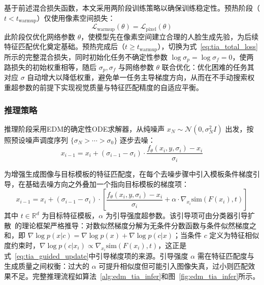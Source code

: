 基于前述混合损失函数，本文采用两阶段训练策略以确保训练稳定性。预热阶段（$t < t_{\text{warmup}}$）仅使用像素空间损失：
\begin{equation}\label{eq:tia_warmup_loss}
  \mathcal{L}_{\text{warmup}}(\theta) = \mathcal{L}_{\text{pixel}}(\theta)
\end{equation}
此阶段仅优化网络参数 $\theta$，使模型先在像素空间建立合理的人脸生成先验，为后续特征匹配优化奠定基础。预热完成后（$t \geq t_{\text{warmup}}$），切换为式~\eqref{eq:tia_total_loss}所示的完整混合损失，同时初始化任务不确定性参数 $\log\sigma_p = \log\sigma_f = 0$，使两路损失的初始权重相等，随后 $\sigma_p, \sigma_f$ 与网络参数 $\theta$ 联合优化：优化困难的任务其对应 $\sigma$ 自动增大以降低权重，避免单一任务主导梯度方向，从而在不手动搜索权重超参数的前提下实现视觉质量与特征匹配精度的自适应平衡。

\subsubsection{推理策略}

推理阶段采用EDM的确定性ODE求解器，从纯噪声 $x_N \sim \mathcal{N}(0, \sigma_N^2 I)$ 出发，按照预设噪声调度序列 $\{\sigma_N > \cdots > \sigma_0\}$ 逐步去噪：
\begin{equation}\label{eq:tia_sampling_update}
  x_{i-1} = x_i + (\sigma_{i-1} - \sigma_i) \cdot \frac{f_\theta(x_i, y, \sigma_i) - x_i}{\sigma_i}
\end{equation}

为增强生成图像与目标模板的特征匹配度，在每个去噪步骤中引入模板条件梯度引导，在基础去噪方向之外叠加一个指向目标模板的梯度项：
\begin{equation}\label{eq:tia_guided_update}
  x_{i-1} = x_i + (\sigma_{i-1} - \sigma_i) \cdot \left[ \frac{f_\theta(x_i, y, \sigma_i) - x_i}{\sigma_i} + \alpha \cdot \nabla_{x_i} \mathrm{sim}(F(x_i), t) \right]
\end{equation}
其中 $t \in \mathbb{R}^d$ 为目标特征模板，$\alpha$ 为引导强度超参数。该引导项可由分类器引导扩散~\cite{rombach2022high}的理论框架严格推导：对数似然梯度分解为无条件分数函数与条件似然梯度之和，即 $\nabla \log p(x|c) = \nabla \log p(x) + \nabla \log p(c|x)$；当条件 $c$ 定义为特征相似度约束时，$\nabla \log p(c|x_i) \propto \nabla_{x_i} \mathrm{sim}(F(x_i), t)$，这正是式~\eqref{eq:tia_guided_update}中引导梯度项的来源。引导强度 $\alpha$ 需在特征匹配度与生成质量之间权衡：过大的 $\alpha$ 可提升相似度但可能引入图像失真，过小则匹配效果不足。完整推理流程如算法~\ref{alg:edm_tia_infer}和图~\ref{fig:edm_tia_infer}所示。

